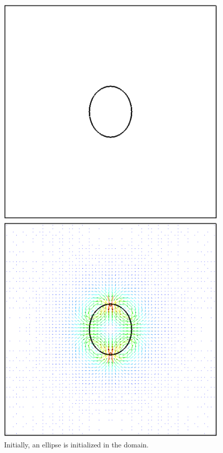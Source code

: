 \begin{figure}[htbp]
	\centering
	\begin{minipage}{.3\textwidth}
		\centering
		\includegraphics[width=1.0\linewidth]{figs/Odrop1}
		\caption{Initially, an ellipse is initialized in the domain.}
		\label{fig:Odrop1}
	\end{minipage}%
\hfill
	\begin{minipage}{0.3\textwidth}
		\centering
		\includegraphics[width=1.0\linewidth]{figs/Odrop2}

\end{minipage}
\end{figure}
